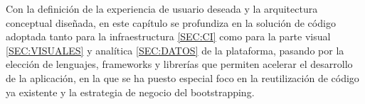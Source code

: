 
Con la definición de la experiencia de usuario deseada y la arquitectura conceptual diseñada, en este capítulo se profundiza en la solución de código adoptada tanto para la infraestructura \ref{SEC:CI}  como para la parte visual \ref{SEC:VISUALES} y analítica \ref{SEC:DATOS} de la plataforma, pasando por la elección de lenguajes, frameworks y librerías que permiten acelerar el desarrollo de la aplicación, en la que se ha puesto especial foco en la reutilización de código ya existente y la estrategia de negocio del bootstrapping\cite{Bootstrapping}.
